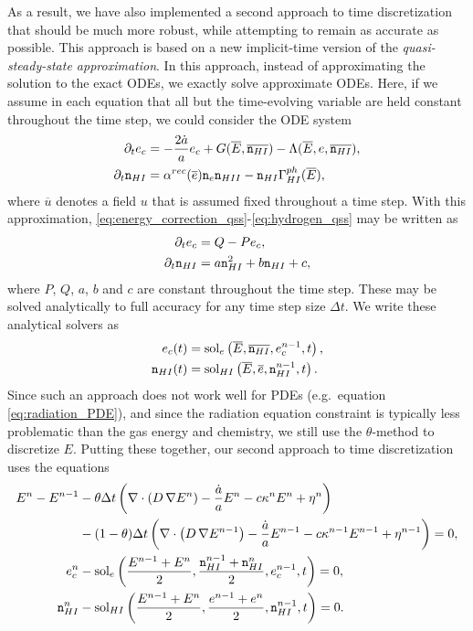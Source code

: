 \documentclass[letterpaper,10pt]{article}
\renewcommand{\(}{\left(}
\renewcommand{\)}{\right)}
\newcommand{\dt}{\Delta t}
\newcommand{\mn}{{\tt n}}
\begin{document}
As a result, we have also implemented a second approach to time
discretization that should be much more robust, while attempting to
remain as accurate as possible.  This approach is based on a new
implicit-time version of the {\em quasi-steady-state approximation}.
In this approach, instead of approximating the solution to the exact
ODEs, we exactly solve approximate ODEs.  Here, if we assume in each
equation that all but the time-evolving variable are held constant
throughout the time step, we could consider the ODE system
\begin{align}
  \label{eq:energy_correction_qss}
  \partial_t e_c &= -\frac{2\dot{a}}{a}e_c + G(\overline{E},\overline{\mn_{HI}}) - \Lambda(\overline{E},e,\overline{\mn_{HI}}), \\
  \label{eq:hydrogen_qss}
  \partial_t \mn_{HI} &= \alpha^{rec}(\overline{e}) \mn_e \mn_{HII} - \mn_{HI} \Gamma_{HI}^{ph}(\overline{E}),
\end{align}
where $\overline{u}$ denotes a field $u$ that is assumed fixed
throughout a time step.  With this approximation,
\eqref{eq:energy_correction_qss}-\eqref{eq:hydrogen_qss} may be
written as
\begin{align}
  \label{eq:energy_correction_qss2}
  \partial_t e_c &= Q - Pe_c, \\
  \label{eq:hydrogen_qss2}
  \partial_t \mn_{HI} &= a \mn_{HI}^2 + b\mn_{HI} + c,
\end{align}
where $P$, $Q$, $a$, $b$ and $c$ are constant throughout the time
step.  These may be solved analytically to full accuracy for any time
step size $\dt$.  We write these analytical solvers as
\begin{align}
  \label{eq:energy_correction_qss3}
  e_c(t) &= \text{sol}_e\left(\overline{E},\overline{\mn_{HI}},e_c^{n-1},t\right), \\
  \label{eq:hydrogen_qss3}
  \mn_{HI}(t) &= \text{sol}_{HI}\left(\overline{E},\overline{e},\mn_{HI}^{n-1},t\right).
\end{align}
Since such an approach does not work well for PDEs (e.g.~equation
\eqref{eq:radiation_PDE}), and since the radiation equation constraint
is typically less problematic than the gas energy and chemistry, we
still use the $\theta$-method to discretize $E$.  Putting these
together, our second approach to time discretization uses the
equations 
\begin{align}
  \label{eq:radiation_PDE_iqss}
  E^n - E^{n-1} &- \theta\dt\left(\nabla\cdot\(D\,\nabla E^n\) - \frac{\dot{a}}{a} E^n -
    c\kappa^n E^n + \eta^n\right) \\ 
  \notag
  & - (1-\theta)\dt\left(\nabla\cdot\(D\,\nabla E^{n-1}\) - \frac{\dot{a}}{a} E^{n-1} -
    c\kappa^{n-1} E^{n-1} + \eta^{n-1}\right) = 0, \\ 
  \label{eq:energy_correction_iqss}
  e_c^n &- \text{sol}_e\left(\frac{E^{n-1}+E^n}{2},\frac{\mn_{HI}^{n-1}+\mn_{HI}^n}{2},e_c^{n-1},t\right) = 0, \\
  \label{eq:hydrogen_iqss}
  \mn_{HI}^n &- \text{sol}_{HI}\left(\frac{E^{n-1}+E^n}{2},\frac{e^{n-1}+e^n}{2},\mn_{HI}^{n-1},t\right) = 0.
\end{align}
\end{document}
